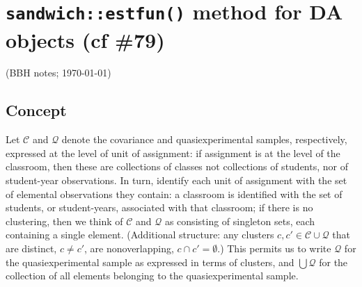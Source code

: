 \documentclass{article}
\author{BBH}
\begin{document}
\section{\texttt{sandwich::estfun()} method for DA objects (cf
  \#79)}
(BBH notes; \today)
\subsection{Concept}

Let $\mathcal{C}$ and $\mathcal{Q}$ denote the covariance and
quasiexperimental samples, respectively, expressed at the level of
unit of assignment: if assignment is at the level of the classroom,
then these are collections of classes not collections of students, nor
of student-year observations.  In turn, identify each unit of assignment
with the set of elemental observations they contain: a classroom is
identified with the 
set of students, or student-years, associated with that classroom;
if there is no clustering, then we think of $\mathcal{C}$ and
$\mathcal{Q}$ as consisting of singleton sets, each containing a
single element.  (Additional structure: any clusters $c, c' \in \mathcal{C}
\cup \mathcal{Q}$ that are distinct, $c  \neq c'$, are nonoverlapping, $c \cap c' = \emptyset$.) This permits us to write $\mathcal{Q}$ for the
quasiexperimental sample as expressed in terms of clusters, and $\bigcup
\mathcal{Q}$ for the collection of all elements belonging to the
quasiexperimental sample.
\end{document}
